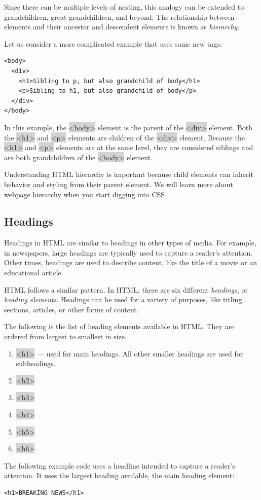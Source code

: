 \documentclass[11pt]{article}
\begin{document}
Since there can be multiple levels of nesting, this analogy can be extended to grandchildren, great-grandchildren, and beyond. The relationship between elements and their ancestor and descendent elements is known as \textit{hierarchy}. 

Let us consider a more complicated example that uses some new tags: 
\begin{lstlisting}
<body>
  <div>
    <h1>Sibling to p, but also grandchild of body</h1>
    <p>Sibling to h1, but also grandchild of body</p>
  </div>
</body>
\end{lstlisting}
In this example, the \colorbox{lightgray}{<body>} element is the parent of the \colorbox{lightgray}{<div>} element. Both the \colorbox{lightgray}{<h1>} and \colorbox{lightgray}{<p>} elements are children of the \colorbox{lightgray}{<div>} element. Because the \colorbox{lightgray}{<h1>} and \colorbox{lightgray}{<p>} elements are at the same level, they are considered siblings and are both grandchildren of the \colorbox{lightgray}{<body>} element.

Understanding HTML hierarchy is important because child elements can inherit behavior and styling from their parent element. We will learn more about webpage hierarchy when you start digging into CSS.

\subsection{Headings}
Headings in HTML are similar to headings in other types of media. For example, in newspapers, large headings are typically used to capture a reader’s attention. Other times, headings are used to describe content, like the title of a movie or an educational article.

HTML follows a similar pattern. In HTML, there are six different \textit{headings}, or \textit{heading elements}. Headings can be used for a variety of purposes, like titling sections, articles, or other forms of content.

The following is the list of heading elements available in HTML. They are ordered from largest to smallest in size.
\begin{enumerate}[leftmargin = *]
\item \colorbox{lightgray}{<h1>} — used for main headings. All other smaller headings are used for subheadings.
\item \colorbox{lightgray}{<h2>}
\item \colorbox{lightgray}{<h3>}
\item \colorbox{lightgray}{<h4>}
\item \colorbox{lightgray}{<h5>}
\item \colorbox{lightgray}{<h6>}
\end{enumerate}
The following example code uses a headline intended to capture a reader’s attention. It uses the largest heading available, the main heading element:
\begin{lstlisting}
<h1>BREAKING NEWS</h1>
\end{lstlisting}
\end{document}
